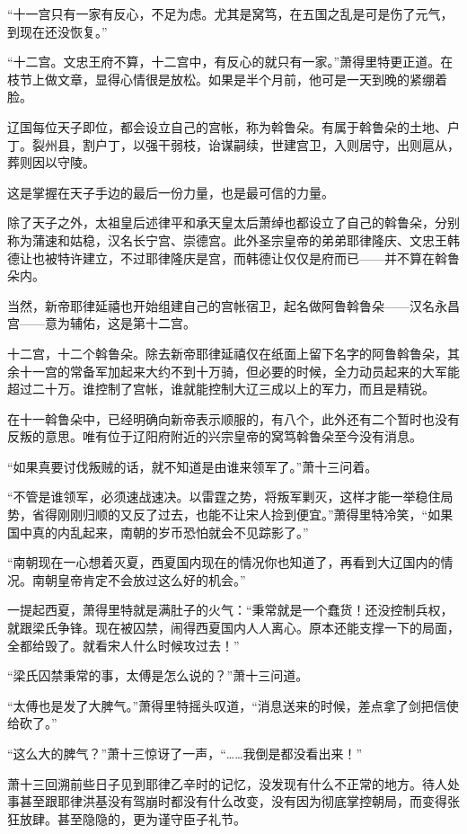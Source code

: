 “十一宫只有一家有反心，不足为虑。尤其是窝笃，在五国之乱是可是伤了元气，到现在还没恢复。”

“十二宫。文忠王府不算，十二宫中，有反心的就只有一家。”萧得里特更正道。在枝节上做文章，显得心情很是放松。如果是半个月前，他可是一天到晚的紧绷着脸。

辽国每位天子即位，都会设立自己的宫帐，称为斡鲁朵。有属于斡鲁朵的土地、户丁。裂州县，割户丁，以强干弱枝，诒谋嗣续，世建宫卫，入则居守，出则扈从，葬则因以守陵。

这是掌握在天子手边的最后一份力量，也是最可信的力量。

除了天子之外，太祖皇后述律平和承天皇太后萧绰也都设立了自己的斡鲁朵，分别称为蒲速和姑稳，汉名长宁宫、崇德宫。此外圣宗皇帝的弟弟耶律隆庆、文忠王韩德让也被特许建立，不过耶律隆庆是宫，而韩德让仅仅是府而已——并不算在斡鲁朵内。

当然，新帝耶律延禧也开始组建自己的宫帐宿卫，起名做阿鲁斡鲁朵——汉名永昌宫——意为辅佑，这是第十二宫。

十二宫，十二个斡鲁朵。除去新帝耶律延禧仅在纸面上留下名字的阿鲁斡鲁朵，其余十一宫的常备军加起来大约不到十万骑，但必要的时候，全力动员起来的大军能超过二十万。谁控制了宫帐，谁就能控制大辽三成以上的军力，而且是精锐。

在十一斡鲁朵中，已经明确向新帝表示顺服的，有八个，此外还有二个暂时也没有反叛的意思。唯有位于辽阳府附近的兴宗皇帝的窝笃斡鲁朵至今没有消息。

“如果真要讨伐叛贼的话，就不知道是由谁来领军了。”萧十三问着。

“不管是谁领军，必须速战速决。以雷霆之势，将叛军剿灭，这样才能一举稳住局势，省得刚刚归顺的又反了过去，也能不让宋人捡到便宜。”萧得里特冷笑，“如果国中真的内乱起来，南朝的岁币恐怕就会不见踪影了。”

“南朝现在一心想着灭夏，西夏国内现在的情况你也知道了，再看到大辽国内的情况。南朝皇帝肯定不会放过这么好的机会。”

一提起西夏，萧得里特就是满肚子的火气：“秉常就是一个蠢货！还没控制兵权，就跟梁氏争锋。现在被囚禁，闹得西夏国内人人离心。原本还能支撑一下的局面，全都给毁了。就看宋人什么时候攻过去！”

“梁氏囚禁秉常的事，太傅是怎么说的？”萧十三问道。

“太傅也是发了大脾气。”萧得里特摇头叹道，“消息送来的时候，差点拿了剑把信使给砍了。”

“这么大的脾气？”萧十三惊讶了一声，“……我倒是都没看出来！”

萧十三回溯前些日子见到耶律乙辛时的记忆，没发现有什么不正常的地方。待人处事甚至跟耶律洪基没有驾崩时都没有什么改变，没有因为彻底掌控朝局，而变得张狂放肆。甚至隐隐的，更为谨守臣子礼节。

